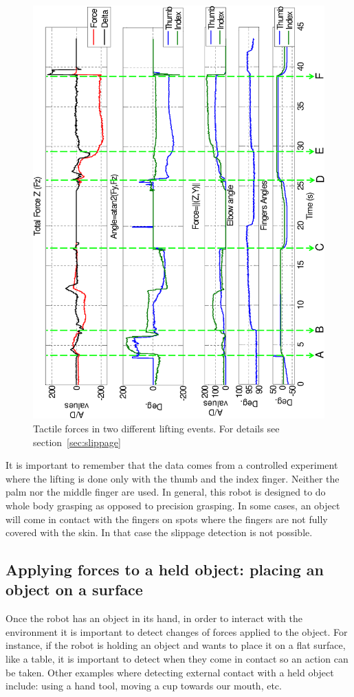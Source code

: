 \begin{figure}[htbp]
\centerline{
\includegraphics[height=\textwidth, angle=270 ]{./figures/ThesisSlipX.eps}
} \caption[Tactile forces when lifting an object]{Tactile forces
in two different lifting events. For details see
section~\ref{sec:slippage} } \label{fig:slip}
\end{figure}




It is important to remember that the data comes from a controlled
experiment where the lifting is done only with the thumb and the
index finger. Neither the palm nor the middle finger are used. In
general, this robot is designed to do whole body grasping as
opposed to precision grasping. In some cases, an object will come
in contact with the fingers on spots where the fingers are not
fully covered with the skin. In that case the slippage detection
is not possible.

\subsection{Applying forces to a held object: placing an object on a surface}

Once the robot has an object in its hand, in order to interact
with the environment it is important to detect changes of forces
applied to the object. For instance, if the robot is holding an
object and wants to place it on a flat surface, like a table, it
is important to detect when they come in contact so an action can
be taken. Other examples where detecting external contact with a
held object include: using a hand tool, moving a cup towards our
mouth, etc.

